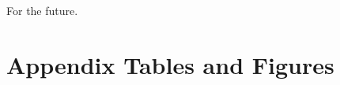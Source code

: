\documentclass{article}
\begin{document}
For the future.

\clearpage
\nocite{*}
\printbibliography


\clearpage

\section*{}
\vspace{5mm}

\appendix

\renewcommand\thetable{\thesection.\arabic{table}}    
\renewcommand\thefigure{\thesection.\arabic{figure}} 
\setcounter{table}{0}
\setcounter{figure}{0}

\section{Appendix Tables and Figures}



\end{document}
